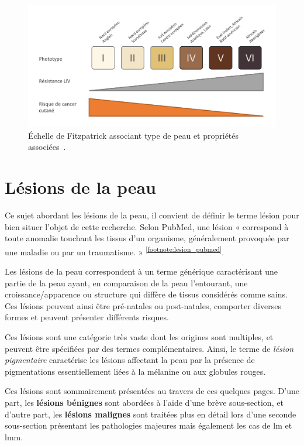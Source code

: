 \begin{figure}[H]
    \centering
    \includegraphics[width=0.8\linewidth]{contents/chapter_1/resources/scheme_fitzpatrick_scale.pdf}
    \caption{Échelle de Fitzpatrick associant type de peau et propriétés associées~\cite{Fitzpatrick1988}.}
    \label{fig:scheme_fitzpatrick_scale}
\end{figure}


\section{Lésions de la peau}
Ce sujet abordant les lésions de la peau, il convient de définir le terme lésion pour bien situer l’objet de cette recherche. Selon PubMed, une lésion « correspond à toute anomalie touchant les tissus d’un organisme, généralement provoquée par une maladie ou par un traumatisme. » \textsuperscript{\ref{footnote:lesion_pubmed}}.\par
\addtocounter{footnote}{1}

Les lésions de la peau correspondent à un terme générique caractérisant une partie de la peau ayant, en comparaison de la peau l’entourant, une croissance/apparence ou structure qui diffère de tissus considérés comme sains. Ces lésions peuvent ainsi être pré-natales ou post-natales, comporter diverses formes et peuvent présenter différents risques.\par

Ces lésions sont une catégorie très vaste dont les origines sont multiples, et peuvent être spécifiées par des termes complémentaires. Ainsi, le terme de \textit{lésion pigmentaire} caractérise les lésions affectant la peau par la présence de pigmentations essentiellement liées à la mélanine ou aux globules rouges.\par

Ces lésions sont sommairement présentées au travers de ces quelques pages. D'une part, les \textbf{lésions bénignes} sont abordées à l'aide d'une brève sous-section, et d'autre part, les \textbf{lésions malignes} sont traitées plus en détail lors d'une seconde sous-section présentant les pathologies majeures mais également les cas de \acrlong{lm} et \acrlong{lmm}.\par

